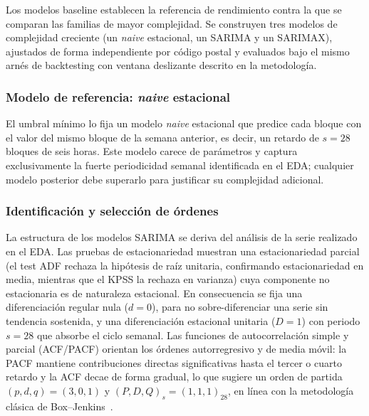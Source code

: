 \documentclass[12pt, a4paper]{article}
\begin{document}
Los modelos baseline establecen la referencia de rendimiento contra la que se comparan las familias de mayor complejidad. Se construyen tres modelos de complejidad creciente (un \textit{naive} estacional, un SARIMA y un SARIMAX), ajustados de forma independiente por código postal y evaluados bajo el mismo arnés de backtesting con ventana deslizante descrito en la metodología.

\subsubsection{Modelo de referencia: \textit{naive} estacional}


El umbral mínimo lo fija un modelo \textit{naive} estacional que predice cada bloque con el valor del mismo bloque de la semana anterior, es decir, un retardo de $s=28$ bloques de seis horas. Este modelo carece de parámetros y captura exclusivamente la fuerte periodicidad semanal identificada en el EDA; cualquier modelo posterior debe superarlo para justificar su complejidad adicional.

\subsubsection{Identificación y selección de órdenes}


La estructura de los modelos SARIMA se deriva del análisis de la serie realizado en el EDA. Las pruebas de estacionariedad muestran una estacionariedad parcial (el test ADF rechaza la hipótesis de raíz unitaria, confirmando estacionariedad en media, mientras que el KPSS la rechaza en varianza) cuya componente no estacionaria es de naturaleza estacional. En consecuencia se fija una diferenciación regular nula ($d=0$), para no sobre-diferenciar una serie sin tendencia sostenida, y una diferenciación estacional unitaria ($D=1$) con periodo $s=28$ que absorbe el ciclo semanal. Las funciones de autocorrelación simple y parcial (ACF/PACF) orientan los órdenes autorregresivo y de media móvil: la PACF mantiene contribuciones directas significativas hasta el tercer o cuarto retardo y la ACF decae de forma gradual, lo que sugiere un orden de partida $(p,d,q)=(3,0,1)$ y $(P,D,Q)_s=(1,1,1)_{28}$, en línea con la metodología clásica de Box--Jenkins~\cite{boxjenkins2015}.
\end{document}
